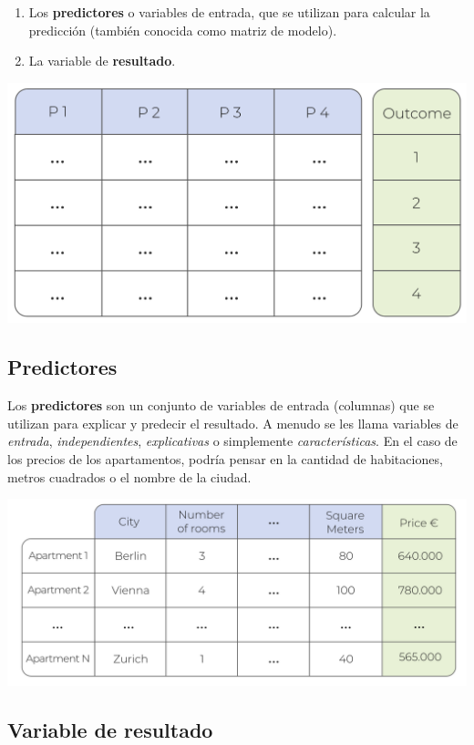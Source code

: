 \documentclass[
]{book}
\providecommand{\tightlist}{%
  \setlength{\itemsep}{0pt}\setlength{\parskip}{0pt}}
\begin{document}
\begin{enumerate}
\def\labelenumi{\arabic{enumi}.}
\tightlist
\item
  Los \textbf{predictores} o variables de entrada, que se utilizan para calcular la predicción (también conocida como matriz de modelo).
\item
  La variable de \textbf{resultado}.
\end{enumerate}

\includegraphics{img/tab.png}

\hypertarget{predictores}{%
\subsection{Predictores}\label{predictores}}

Los \textbf{predictores} son un conjunto de variables de entrada (columnas) que se utilizan para explicar y predecir el resultado. A menudo se les llama variables de \emph{entrada}, \emph{independientes}, \emph{explicativas} o simplemente \emph{características}. En el caso de los precios de los apartamentos, podría pensar en la cantidad de habitaciones, metros cuadrados o el nombre de la ciudad.

\includegraphics{img/tab1.png}

\hypertarget{variable-de-resultado}{%
\subsection{Variable de resultado}\label{variable-de-resultado}}
\end{document}
